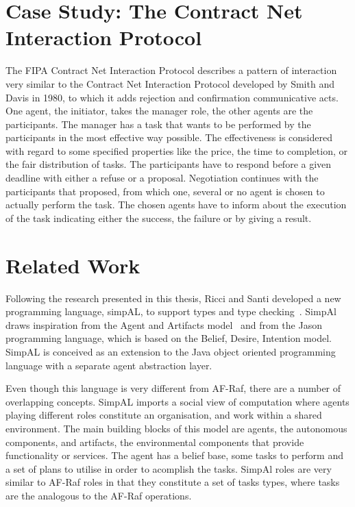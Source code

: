 \documentclass[a4paper,12pt,oneside,fleqn]{book} %
\theoremstyle{plain}
\theoremstyle{definition}
\theoremstyle{remark}
\begin{document}
\chapter{Case Study: The Contract Net Interaction Protocol} %

The FIPA Contract Net Interaction Protocol\cite{} describes a pattern of
interaction very similar to the Contract Net Interaction Protocol\cite{}
developed by Smith and Davis in 1980, to which it adds rejection and
confirmation communicative acts. One agent, the initiator, takes the
manager role, the other agents are the participants. The manager has a task
that wants to be performed by the participants in the most effective way
possible. The effectiveness is considered with regard to some specified
properties like the price, the time to completion, or the fair distribution
of tasks. The participants have to respond before a given deadline with
either a refuse or a proposal. Negotiation continues with the participants
that proposed, from which one, several or no agent is chosen to actually
perform the task. The chosen agents have to inform about the execution of
the task indicating either the success, the failure or by giving a result.

\chapter{Related Work} %


Following the research presented in this thesis, Ricci  and Santi developed
a new programming language, simpAL, to support types and type
checking~\cite{}. SimpAl draws inspiration from the Agent and Artifacts
model~\cite{} and from the Jason programming language, which is based on
the Belief, Desire, Intention model. SimpAL is conceived as an extension to
the Java object oriented programming language with a separate agent
abstraction layer. 

Even though this language is very different from AF-Raf, there are a
number of overlapping concepts. SimpAL imports a social view of computation
where agents playing different roles constitute an organisation, and work
within a shared environment. The main building blocks of this model are
agents, the autonomous components, and artifacts, the environmental
components that provide functionality or services. The agent has a belief
base, some tasks to perform and a set of plans to utilise in order to
acomplish the tasks. SimpAl roles are very similar to AF-Raf roles in that
they constitute a set of tasks types, where tasks are the analogous to the
AF-Raf operations. 
\end{document}
